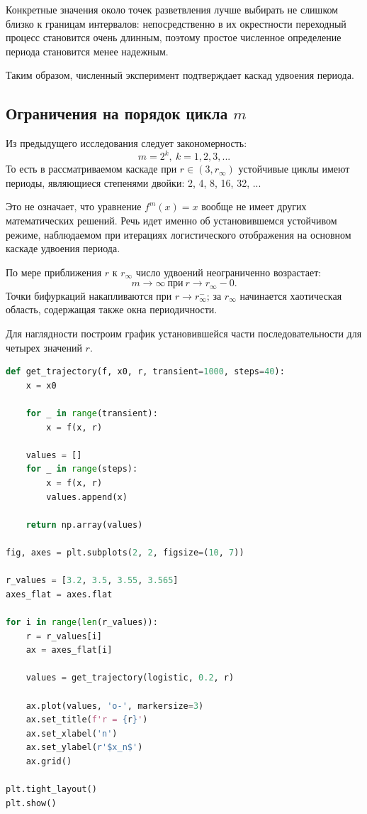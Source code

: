 \documentclass[14pt,a4paper]{extarticle}
\begin{document}
Конкретные значения около точек разветвления лучше выбирать не слишком близко к границам интервалов: непосредственно в их окрестности переходный процесс становится очень длинным, поэтому простое численное определение периода становится менее надежным.

Таким образом, численный эксперимент подтверждает каскад удвоения периода.


\subsection{Ограничения на порядок цикла $m$}

Из предыдущего исследования следует закономерность:
\[
m = 2^k,\ k = 1, 2, 3, ...
\]
То есть в рассматриваемом каскаде при $r \in (3, r_{\infty})$ устойчивые циклы имеют периоды, являющиеся степенями двойки: 2, 4, 8, 16, 32, ...

Это не означает, что уравнение $f^m(x) = x$ вообще не имеет других математических решений. Речь идет именно об установившемся устойчивом режиме, наблюдаемом при итерациях логистического отображения на основном каскаде удвоения периода.

По мере приближения $r$ к $r_{\infty}$ число удвоений неограниченно возрастает:
\[
m \rightarrow \infty\ \text{при}\ r \rightarrow r_{\infty} − 0.
\]
Точки бифуркаций накапливаются при $r \rightarrow r_{\infty}^-$; за $r_{\infty}$ начинается хаотическая область, содержащая также окна периодичности.

Для наглядности построим график установившейся части последовательности для четырех значений $r$.

\begin{lstlisting}[language=python]
def get_trajectory(f, x0, r, transient=1000, steps=40):
    x = x0

    for _ in range(transient):
        x = f(x, r)

    values = []
    for _ in range(steps):
        x = f(x, r)
        values.append(x)

    return np.array(values)

fig, axes = plt.subplots(2, 2, figsize=(10, 7))

r_values = [3.2, 3.5, 3.55, 3.565]
axes_flat = axes.flat

for i in range(len(r_values)):
    r = r_values[i]
    ax = axes_flat[i]

    values = get_trajectory(logistic, 0.2, r)

    ax.plot(values, 'o-', markersize=3)
    ax.set_title(f'r = {r}')
    ax.set_xlabel('n')
    ax.set_ylabel(r'$x_n$')
    ax.grid()

plt.tight_layout()
plt.show()
\end{lstlisting}
\end{document}
